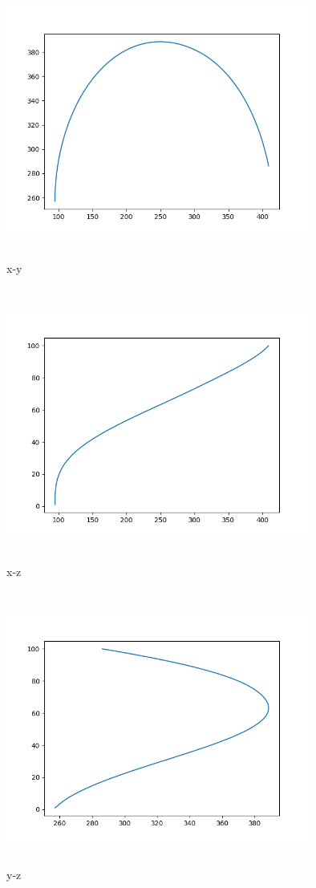 \documentclass[UTF8]{ctexart}
\begin{document}
\begin{figure}[H]
 \centering
  \includegraphics[width=10cm,height=9cm]{2001_1.png}
  \caption{x-y}
\end{figure}
\begin{figure}[H]
 \centering
  \includegraphics[width=10cm,height=9cm]{2001_2.png}
  \caption{x-z}
\end{figure}
\begin{figure}[H]
 \centering
  \includegraphics[width=10cm,height=9cm]{2001_3.png}
  \caption{y-z}
\end{figure}
\end{document}
